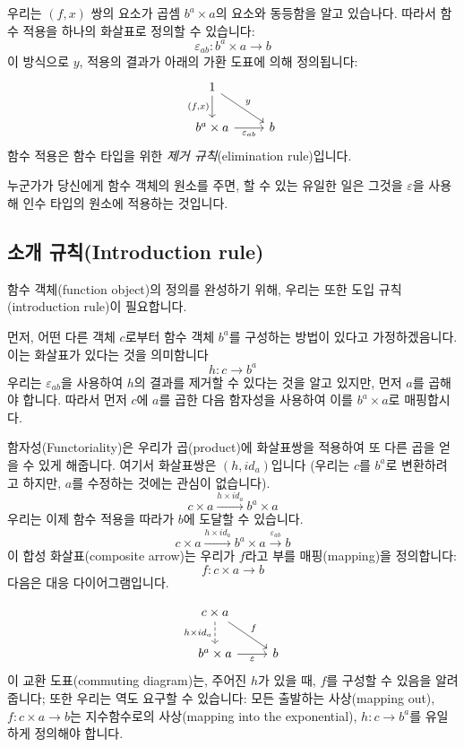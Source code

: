 \documentclass[DaoFP]{subfiles}
\begin{document}
우리는 $(f, x)$ 쌍의 요소가 곱셈 $b^a \times a$의 요소와 동등함을 알고 있습나다. 따라서 함수 적용을 하나의 화살표로 정의할 수 있습니다:
\[\varepsilon_{a b} \colon b^a \times a \to b\]
이 방식으로 $y$, 적용의 결과가 아래의 가환 도표에 의해 정의됩니다:
\[
 \begin{tikzcd}
 1
 \arrow[d, "{(f, x)}"']
 \arrow[rd, "y"]
 \\
 b^a \times a
 \arrow[r, "\varepsilon_{a b}"']
& b
 \end{tikzcd}
\]
함수 적용은 함수 타입을 위한 \emph{제거 규칙}(elimination rule)입니다.

누군가가 당신에게 함수 객체의 원소를 주면, 할 수 있는 유일한 일은 그것을 $\varepsilon$을 사용해 인수 타입의 원소에 적용하는 것입니다.

\subsection{소개 규칙(Introduction rule)}
함수 객체(function object)의 정의를 완성하기 위해, 우리는 또한 도입 규칙(introduction rule)이 필요합니다.

먼저, 어떤 다른 객체 $c$로부터 함수 객체 $b^a$를 구성하는 방법이 있다고 가정하겠음니다. 이는 화살표가 있다는 것을 의미함니다
\[h \colon c \to b^a\]
우리는 $\varepsilon_{a b}$을 사용하여 $h$의 결과를 제거할 수 있다는 것을 알고 있지만, 먼저 $a$를 곱해야 합니다. 따라서 먼저 $c$에 $a$를 곱한 다음 함자성을 사용하여 이를 $b^a \times a$로 매핑합시다.

함자성(Functoriality)은 우리가 곱(product)에 화살표쌍을 적용하여 또 다른 곱을 얻을 수 있게 해줍니다. 여기서 화살표쌍은 $(h, id_a)$입니다 (우리는 $c$를 $b^a$로 변환하려고 하지만, $a$를 수정하는 것에는 관심이 없습니다).
\[ c \times a \xrightarrow{h \times id_a} b^a \times a \]
우리는 이제 함수 적용을 따라가 $b$에 도달할 수 있습니다.
\[ c \times a \xrightarrow{h \times id_a} b^a \times a \xrightarrow{\varepsilon_{a b}} b\]
이 합성 화살표(composite arrow)는 우리가 $f$라고 부를 매핑(mapping)을 정의합니다:
\[f \colon c \times a \to b\]
다음은 대응 다이어그램입니다.

\[
 \begin{tikzcd}
 c \times a
 \arrow[d, dashed, "h \times id_a"']
 \arrow[rd, "f"]
 \\
 b^a \times a
 \arrow[r, "\varepsilon"']
& b
 \end{tikzcd}
\]
이 교환 도표(commuting diagram)는, 주어진 $h$가 있을 때, $f$를 구성할 수 있음을 알려줍니다; 또한 우리는 역도 요구할 수 있습니다: 모든 출발하는 사상(mapping out), $f \colon c \times a \to b$는 지수함수로의 사상(mapping into the exponential), $h \colon c \to b^a$를 유일하게 정의해야 합니다.
\end{document}
